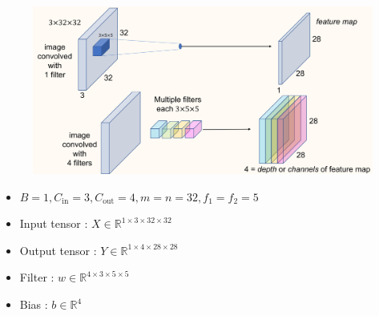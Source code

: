 \begin{example}
    \begin{figure}[H]
        \centering
        \includegraphics[width=1.0\textwidth]{.././assets/5.2.png}
    \end{figure}

    \begin{itemize}
        \item $B = 1, C_{\text{in}} = 3, C_{\text{out}} = 4, m=n=32, f_1=f_2=5$
        \item Input tensor : $X \in \mathbb{R}^{1 \times 3 \times 32 \times 32}$
        \item Output tensor : $Y \in \mathbb{R}^{1 \times 4 \times 28 \times 28}$
        \item Filter : $w \in \mathbb{R}^{4 \times 3 \times 5 \times 5}$
        \item Bias : $b \in \mathbb{R}^{4}$
    \end{itemize}
\end{example}

